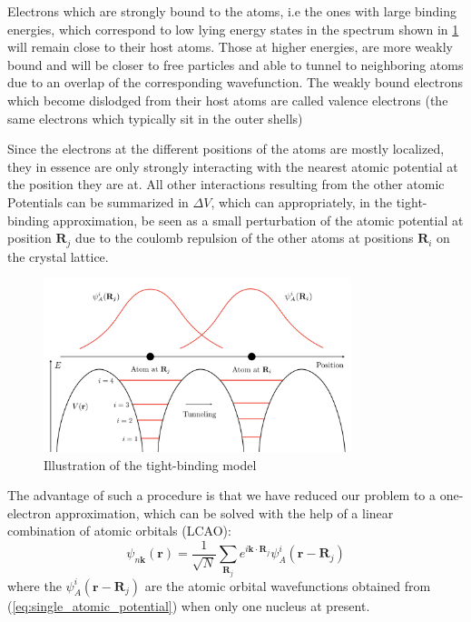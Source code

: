 \documentclass[11pt, a4paper]{article}
\theoremstyle{definition} %
\begin{document}
Electrons which are strongly bound to the atoms, i.e the ones with large binding energies, which correspond to low lying energy states in the spectrum shown in \ref{fig:illustration_tightbinding} will remain close to their host atoms. Those at higher energies, are more weakly bound and will be closer to free particles and able to tunnel to neighboring atoms due to an overlap of the corresponding wavefunction. The weakly bound electrons which become dislodged from their host atoms are called valence electrons (the same electrons which typically sit in the outer shells)

Since the electrons at the different positions of the atoms are mostly localized, they in essence are only strongly interacting with the nearest atomic potential at the position they are at. All other interactions resulting from the other atomic Potentials can be summarized in $\Delta V$, which can appropriately, in the tight-binding approximation, be seen as a small perturbation of the atomic potential at position $\mathbf{R}_j$ due to the coulomb repulsion of the other atoms at positions $\mathbf{R}_i$ on the crystal lattice. 
\begin{figure}[h]
	\centering
	\includegraphics[width = 0.8\textwidth]{TightBindingModel-Illustration}
	\caption{Illustration of the tight-binding model}
	\label{fig:illustration_tightbinding}
\end{figure}
The advantage of such a procedure is that we have reduced our problem to a one-electron approximation, which can be solved with the help of a linear combination of atomic orbitals (LCAO):
\begin{equation}
	\psi_{n \mathbf{k}}(\mathbf{r}) = \frac{1}{\sqrt{N}} \sum_{\mathbf{R}_j} e^{i \mathbf{k} \cdot \mathbf{R}_j } \psi_{A}^i(\mathbf{r} - \mathbf{R}_j)
\end{equation} 
where the $\psi_A^i(\mathbf{r} - \mathbf{R}_j)$ are the atomic orbital wavefunctions obtained from (\ref{eq:single_atomic_potential}) when only one nucleus at present.  
\end{document}
